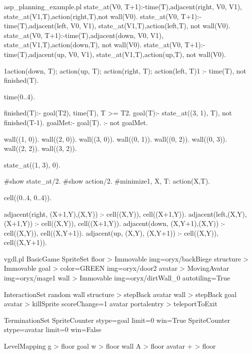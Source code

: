 \begin{filecontents*}{asp_planning_example.pl}
state_at(V0, T+1):-time(T),adjacent(right, V0, V1),
                   state_at(V1,T),action(right,T),not wall(V0).
state_at(V0, T+1):-time(T),adjacent(left, V0, V1),
                   state_at(V1,T),action(left,T), not wall(V0).
state_at(V0, T+1):-time(T),adjacent(down, V0, V1), 
                   state_at(V1,T),action(down,T), not wall(V0).
state_at(V0, T+1):-time(T),adjacent(up, V0, V1), 
                   state_at(V1,T),action(up,T), not wall(V0).

1{action(down, T); 
  action(up, T); 
  action(right, T); 
  action(left, T)}1 :- time(T), not finished(T).

time(0..4).

finished(T):- goal(T2), time(T), T >= T2.
goal(T):- state_at((3, 1), T), not finished(T-1).
goalMet:- goal(T).
:- not goalMet.

wall((1, 0)).
wall((2, 0)).
wall((3, 0)).
wall((0, 1)).
wall((0, 2)).
wall((0, 3)).
wall((2, 2)).
wall((3, 2)).

state_at((1, 3), 0).

#show state_at/2.
#show action/2.
#minimize{1, X, T: action(X,T)}.

cell((0..4, 0..4)).

adjacent(right, (X+1,Y),(X,Y))   :- cell((X,Y)), cell((X+1,Y)).
adjacent(left,(X,Y),  (X+1,Y)) :- cell((X,Y)), cell((X+1,Y)).
adjacent(down, (X,Y+1),(X,Y))   :- cell((X,Y)), cell((X,Y+1)).
adjacent(up,   (X,Y),  (X,Y+1)) :- cell((X,Y)), cell((X,Y+1)).
\end{filecontents*}

\begin{filecontents*}{vgdl.pl}
  BasicGame
    SpriteSet
        floor > Immovable img=oryx/backBiege
        structure > Immovable
        goal  > color=GREEN img=oryx/door2
        avatar > MovingAvatar img=oryx/mage1
        wall > Immovable img=oryx/dirtWall_0 autotiling=True

    InteractionSet
        random wall structure     > stepBack
        avatar wall      > stepBack
        goal   avatar    > killSprite scoreChange=1
        avatar portalentry > teleportToExit

    TerminationSet
        SpriteCounter stype=goal   limit=0 win=True
        SpriteCounter stype=avatar limit=0 win=False

    LevelMapping
        g > floor goal
        w > floor wall
        A > floor avatar
        + > floor
\end{filecontents*}
  
